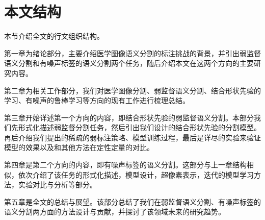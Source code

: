 \section{本文结构}
本节介绍全文的行文组织结构。

第一章为绪论部分，主要介绍医学图像语义分割的标注挑战的背景，并引出弱监督语义分割和有噪声标签的语义分割两个任务，随后介绍本文在这两个方向的主要研究内容。

第二章为相关工作部分，我们对医学图像分割、弱监督语义分割、结合形状先验的学习、有噪声的鲁棒学习等方向的现有工作进行梳理总结。

第三章开始详述第一个方向的内容，即结合形状先验的弱监督语义分割。本部分我们先形式化描述弱监督分割任务，然后引出我们设计的结合形状先验的分割模型。再后介绍我们提出的稀疏的弱标注策略、模型训练过程，最后是详尽的实验来验证模型的效果以及和其他方法在定性定量的对比。

第四章是第二个方向的内容，即有噪声标签的语义分割。这部分与上一章结构相似，依次介绍了该任务的形式化描述，模型设计，超像素表示，迭代的模型学习方法，实验对比与分析等部分。

第五章是全文的总结与展望。该部分总结了我们在弱监督语义分割、有噪声标签的语义分割两方面的方法设计与贡献，并探讨了该领域未来的研究趋势。